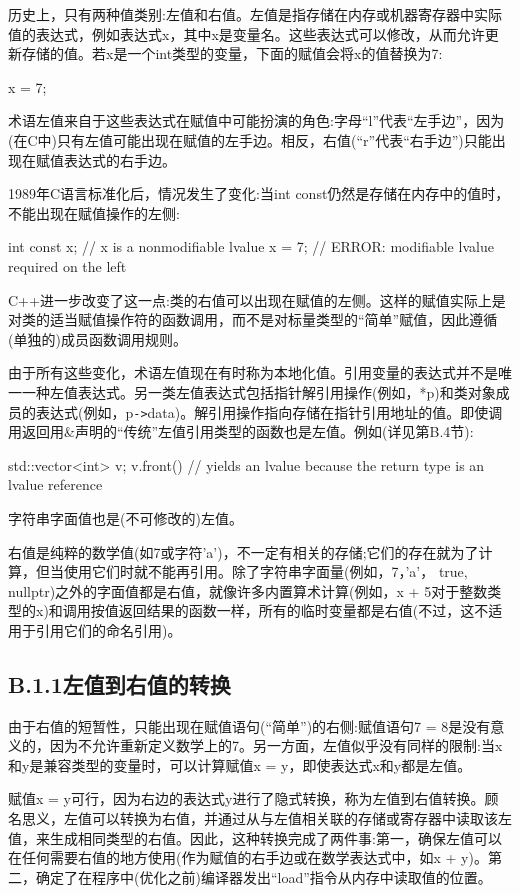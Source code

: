 
历史上，只有两种值类别:左值和右值。左值是指存储在内存或机器寄存器中实际值的表达式，例如表达式x，其中x是变量名。这些表达式可以修改，从而允许更新存储的值。若x是一个int类型的变量，下面的赋值会将x的值替换为7:

\begin{cpp}
x = 7;
\end{cpp}

术语左值来自于这些表达式在赋值中可能扮演的角色:字母“l”代表“左手边”，因为(在C中)只有左值可能出现在赋值的左手边。相反，右值(“r”代表“右手边”)只能出现在赋值表达式的右手边。

1989年C语言标准化后，情况发生了变化:当int const仍然是存储在内存中的值时，不能出现在赋值操作的左侧:

\begin{cpp}
int const x; // x is a nonmodifiable lvalue
x = 7; // ERROR: modifiable lvalue required on the left
\end{cpp}

C++进一步改变了这一点:类的右值可以出现在赋值的左侧。这样的赋值实际上是对类的适当赋值操作符的函数调用，而不是对标量类型的“简单”赋值，因此遵循(单独的)成员函数调用规则。

由于所有这些变化，术语左值现在有时称为本地化值。引用变量的表达式并不是唯一一种左值表达式。另一类左值表达式包括指针解引用操作(例如，*p)和类对象成员的表达式(例如，p\texttt{->}data)。解引用操作指向存储在指针引用地址的值。即使调用返回用\&声明的“传统”左值引用类型的函数也是左值。例如(详见第B.4节):

\begin{cpp}
std::vector<int> v;
v.front() // yields an lvalue because the return type is an lvalue reference
\end{cpp}

字符串字面值也是(不可修改的)左值。

右值是纯粹的数学值(如7或字符'a')，不一定有相关的存储;它们的存在就为了计算，但当使用它们时就不能再引用。除了字符串字面量(例如，7，'a'， true, nullptr)之外的字面值都是右值，就像许多内置算术计算(例如，x + 5对于整数类型的x)和调用按值返回结果的函数一样，所有的临时变量都是右值(不过，这不适用于引用它们的命名引用)。

\subsection{B.1.1\hspace{0.2cm}左值到右值的转换}

由于右值的短暂性，只能出现在赋值语句(“简单”)的右侧:赋值语句7 = 8是没有意义的，因为不允许重新定义数学上的7。另一方面，左值似乎没有同样的限制:当x和y是兼容类型的变量时，可以计算赋值x = y，即使表达式x和y都是左值。

赋值x = y可行，因为右边的表达式y进行了隐式转换，称为左值到右值转换。顾名思义，左值可以转换为右值，并通过从与左值相关联的存储或寄存器中读取该左值，来生成相同类型的右值。因此，这种转换完成了两件事:第一，确保左值可以在任何需要右值的地方使用(作为赋值的右手边或在数学表达式中，如x + y)。第二，确定了在程序中(优化之前)编译器发出“load”指令从内存中读取值的位置。


















